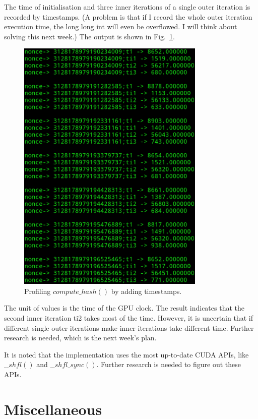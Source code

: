 \documentclass[11pt]{article}
\begin{document}
The time of initialisation and three inner iterations of a single outer iteration is recorded by timestamps. (A problem is that if I record the whole outer iteration execution time, the long long int will even be overflowed. I will think about solving this next week.) The output is shown in Fig.~\ref{fig:ts_compute_hash}.

\begin{figure}[h]
    \centering
    \includegraphics[width=0.8\textwidth]{ts_compute_hash.eps}
    \caption{Profiling $compute\_hash()$ by adding timestamps.}
    \label{fig:ts_compute_hash}
\end{figure}

The unit of values is the time of the GPU clock. The result indicates that the second inner iteration ti2 takes most of the time. However, it is uncertain that if different single outer iterations make inner iterations take different time. Further research is needed, which is the next week's plan.

It is noted that the implementation uses the most up-to-date CUDA APIs, like $\_\_shfl()$ and $\_\_shfl\_sync()$. Further research is needed to figure out these APIs.

\section{Miscellaneous}
\end{document}
